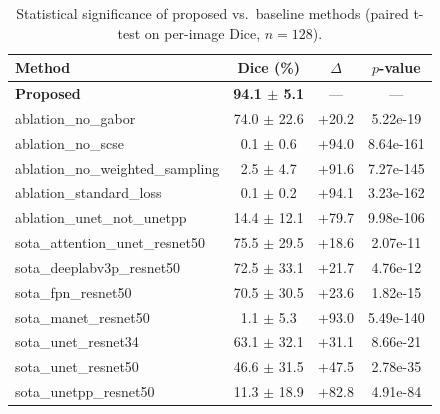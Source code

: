 \begin{table}[t]
\centering
\caption{Statistical significance of proposed vs.\ baseline methods (paired t-test on per-image Dice, $n=128$).}
\label{tab:significance}
\begin{tabular}{lccc}
\toprule
Method & Dice (\%) & $\Delta$ & $p$-value \\
\midrule
\textbf{Proposed} & \textbf{94.1 $\pm$ 5.1} & --- & --- \\
ablation\_no\_gabor & 74.0 $\pm$ 22.6 & +20.2 & 5.22e-19 \\
ablation\_no\_scse & 0.1 $\pm$ 0.6 & +94.0 & 8.64e-161 \\
ablation\_no\_weighted\_sampling & 2.5 $\pm$ 4.7 & +91.6 & 7.27e-145 \\
ablation\_standard\_loss & 0.1 $\pm$ 0.2 & +94.1 & 3.23e-162 \\
ablation\_unet\_not\_unetpp & 14.4 $\pm$ 12.1 & +79.7 & 9.98e-106 \\
sota\_attention\_unet\_resnet50 & 75.5 $\pm$ 29.5 & +18.6 & 2.07e-11 \\
sota\_deeplabv3p\_resnet50 & 72.5 $\pm$ 33.1 & +21.7 & 4.76e-12 \\
sota\_fpn\_resnet50 & 70.5 $\pm$ 30.5 & +23.6 & 1.82e-15 \\
sota\_manet\_resnet50 & 1.1 $\pm$ 5.3 & +93.0 & 5.49e-140 \\
sota\_unet\_resnet34 & 63.1 $\pm$ 32.1 & +31.1 & 8.66e-21 \\
sota\_unet\_resnet50 & 46.6 $\pm$ 31.5 & +47.5 & 2.78e-35 \\
sota\_unetpp\_resnet50 & 11.3 $\pm$ 18.9 & +82.8 & 4.91e-84 \\
\bottomrule
\end{tabular}
\end{table}